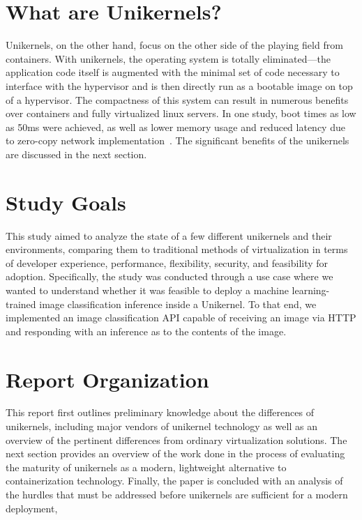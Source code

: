 \documentclass[conference]{IEEEtran}
\begin{document}
\section{What are Unikernels?}

Unikernels, on the other hand, focus on the other side of the
playing field from containers. With unikernels, the operating
system is totally eliminated—the application code itself is
augmented with the minimal set of code necessary to interface
with the hypervisor and is then directly run as a bootable image
on top of a hypervisor. The compactness of this system can result
in numerous benefits over containers and fully virtualized linux
servers. In one study, boot times as low as 50ms were achieved,
as well as lower memory usage and reduced latency due to
zero-copy network implementation~\cite{libos}. The significant
benefits of the unikernels are discussed in the next section.

\section{Study Goals}

This study aimed to analyze the state of a few different
unikernels and their environments, comparing them to traditional
methods of virtualization in terms of developer experience,
performance, flexibility, security, and feasibility for adoption.
Specifically, the study was conducted through a use case where we
wanted to understand whether it was feasible to deploy a machine
learning-trained image classification inference inside a
Unikernel. To that end, we implemented an image classification
API capable of receiving an image via HTTP and responding with an
inference as to the contents of the image.

\section{Report Organization}

This report first outlines preliminary knowledge about the
differences of unikernels, including major vendors of unikernel
technology as well as an overview of the pertinent differences
from ordinary virtualization solutions. The next section provides
an overview of the work done in the process of evaluating
the maturity of unikernels as a modern, lightweight alternative
to containerization technology. Finally, the paper is concluded
with an analysis of the hurdles that must be addressed before
unikernels are sufficient for a modern deployment,
\end{document}
